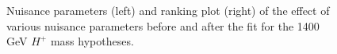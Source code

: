 \begin{figure}[H]
  \centering
  \caption{Nuisance parameters (left) and ranking plot (right) of the effect of various nuisance parameters before and after the fit for the 1400 GeV $H^{+}$ mass hypotheses.}
\end{figure}
